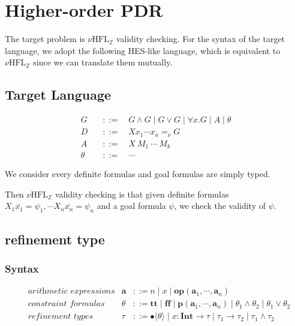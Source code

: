 \documentclass[runningheads]{llncs}
\newcommand \nhz{\(\nu\text{HFL}_\mathbb{Z}\)}
\newcommand \true {\textbf{tt}}
\newcommand \false {\textbf{ff}}
\newcommand \predicate {\textbf{p}}
\newcommand \arith {\textbf{a}}
\newcommand \operator {\mathbin{\textbf{op}}}
\newcommand \atom {A}
\newcommand \goal {G}
\newcommand \definite {D}
\newcommand \stypeint {\textbf{Int}}
\newcommand \stypebool {\bullet}
\newcommand \constraint {\theta}
\newcommand \refty {\tau}
\newcommand \typeint[1]{{#1} : \stypeint}
\newcommand \typebool[1]{\stypebool \langle #1 \rangle}
\begin{document}
\section{Higher-order PDR}

The target problem is \nhz{} validity checking.
For the syntax of the target language, we adopt the following HES-like language,
which is equivalent to \nhz{} since we can translate them mutually.

\subsection{Target Language}

\begin{align*}
    \goal &\quad ::= \quad
          G \land G
          \mid G \lor G
          \mid \forall x. G
          \mid \atom
          \mid \constraint
         \\
    \definite &\quad ::= \quad X x_1 \cdots x_n =_\nu G
          \\
    \atom &\quad ::= \quad X\ M_1\ \cdots\ M_k\\
    \constraint &\quad ::= \quad \cdots
\end{align*}

We consider every definite formulas and goal formulas are simply typed.

Then \nhz{} validity checking is that given definite formulas
\( X_1 \bar{x_1} = \psi_1, \cdots X_n \bar{x_n} =  \psi_n \)
and a goal formula \( \psi \),
we check the validity of \( \psi \).

\subsection{refinement type}

\subsubsection{Syntax}

\begin{align*}
  &\textit{arithmetic expressions} &
  \arith &::=
  n
  \mid
  x
  \mid
  \operator(\arith_1, \cdots, \arith_n)
  \\
  &\textit{constraint formulas}&
  \constraint &::=
  \true
  \mid \false
  \mid \predicate(\arith_1, \cdots, \arith_n)
  \mid \constraint_1 \land \constraint_2
  \mid \constraint_1 \lor \constraint_2
  \\
  &\textit{refinement types}&
  \refty &::=
  \typebool{\theta}
  \mid \typeint{x} \rightarrow \refty
  \mid \refty_1 \rightarrow \refty_2
  \mid \refty_1 \land \refty_2
\end{align*}
\end{document}
